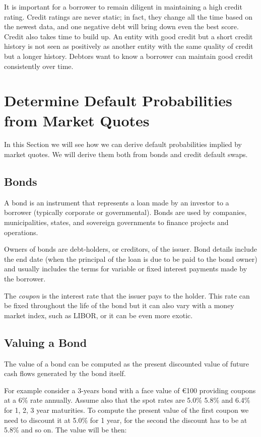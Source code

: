 It is important for a borrower to remain diligent in maintaining a high
credit rating. Credit ratings are never static; in fact, they change all
the time based on the newest data, and one negative debt will bring down
even the best score. 
Credit also takes time to build up. An entity with
good credit but a short credit history is not seen as positively as
another entity with the same quality of credit but a longer history.
Debtors want to know a borrower can maintain good credit consistently
over time.

\section{Determine Default Probabilities from Market Quotes}
In this Section we will see how we can derive default probabilities implied by market quotes. We will derive them both from bonds and credit default swaps.

\subsection{Bonds}\label{bonds}

A bond is an instrument that represents a loan made by an investor to a
borrower (typically corporate or governmental). Bonds are used by
companies, municipalities, states, and sovereign governments to finance
projects and operations. 

Owners of bonds are debt-holders, or creditors,
of the issuer. Bond details include the end date (when the principal of
the loan is due to be paid to the bond owner) and usually includes the
terms for variable or fixed interest payments made by the borrower.

The \emph{coupon} is the interest rate that the issuer pays to the holder.
This rate can be fixed throughout the life of the bond but it can also
vary with a money market index, such as LIBOR, or it can be even more
exotic.

\subsection{Valuing a Bond}\label{sec:bond_pricing}

The value of a bond can be computed as the present discounted value of
future cash flows generated by the bond itself.

For example consider a 3-years bond with a face value of \euro{100}
providing coupons at a 6\% rate annually. Assume also that the spot
rates are 5.0\% 5.8\% and 6.4\% for 1, 2, 3 year maturities. To
compute the present value of the first coupon we need to discount it at
5.0\% for 1 year, for the second the discount has to be at 5.8\% and so
on. The value will be then:

